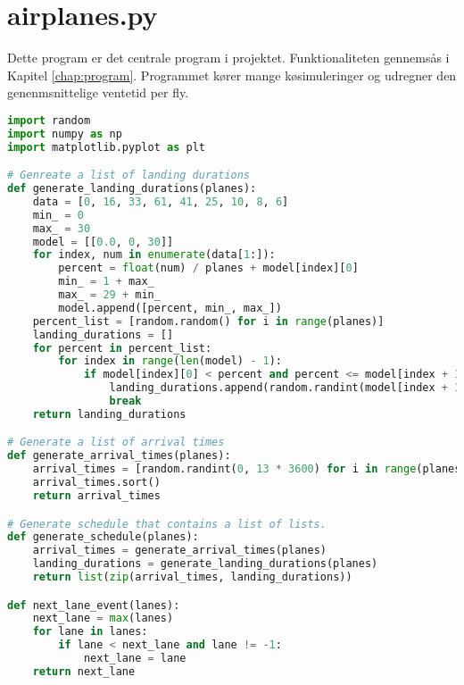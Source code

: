 \section{airplanes.py}
Dette program er det centrale program i projektet.
Funktionaliteten gennemsås i Kapitel \ref{chap:program}.
Programmet kører mange køsimuleringer og udregner den genenmsnittelige ventetid per fly.

\begin{lstlisting}[language=Python, caption={airplanes.py}]
import random
import numpy as np
import matplotlib.pyplot as plt

# Genreate a list of landing durations
def generate_landing_durations(planes):
    data = [0, 16, 33, 61, 41, 25, 10, 8, 6]
    min_ = 0
    max_ = 30
    model = [[0.0, 0, 30]]
    for index, num in enumerate(data[1:]):
        percent = float(num) / planes + model[index][0]
        min_ = 1 + max_
        max_ = 29 + min_
        model.append([percent, min_, max_])
    percent_list = [random.random() for i in range(planes)]
    landing_durations = []
    for percent in percent_list:
        for index in range(len(model) - 1):
            if model[index][0] < percent and percent <= model[index + 1][0]:
                landing_durations.append(random.randint(model[index + 1][1], model[index + 1][2]))
                break
    return landing_durations

# Generate a list of arrival times
def generate_arrival_times(planes):
    arrival_times = [random.randint(0, 13 * 3600) for i in range(planes)]
    arrival_times.sort()
    return arrival_times

# Generate schedule that contains a list of lists.
def generate_schedule(planes):
    arrival_times = generate_arrival_times(planes)
    landing_durations = generate_landing_durations(planes)
    return list(zip(arrival_times, landing_durations))

def next_lane_event(lanes):
    next_lane = max(lanes)
    for lane in lanes:
        if lane < next_lane and lane != -1:
            next_lane = lane
    return next_lane


\end{lstlisting}
